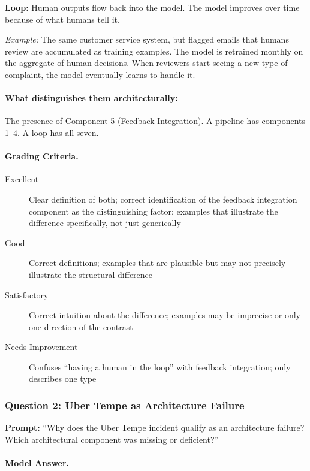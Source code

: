 \textbf{Loop:} Human outputs flow back into the model. The model improves over time because of what humans tell it.

\emph{Example:} The same customer service system, but flagged emails that humans review are accumulated as training examples. The model is retrained monthly on the aggregate of human decisions. When reviewers start seeing a new type of complaint, the model eventually learns to handle it.

\paragraph{What distinguishes them architecturally:} The presence of Component 5 (Feedback Integration). A pipeline has components 1--4. A loop has all seven.

\paragraph{Grading Criteria.}
\begin{description}
    \item[Excellent] Clear definition of both; correct identification of the feedback integration component as the distinguishing factor; examples that illustrate the difference specifically, not just generically
    \item[Good] Correct definitions; examples that are plausible but may not precisely illustrate the structural difference
    \item[Satisfactory] Correct intuition about the difference; examples may be imprecise or only one direction of the contrast
    \item[Needs Improvement] Confuses ``having a human in the loop'' with feedback integration; only describes one type
\end{description}

\subsubsection{Question 2: Uber Tempe as Architecture Failure}

\textbf{Prompt:} ``Why does the Uber Tempe incident qualify as an architecture failure? Which architectural component was missing or deficient?''

\paragraph{Model Answer.}

